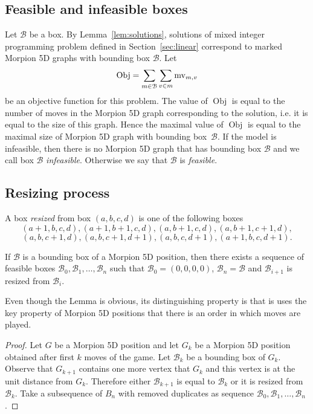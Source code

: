 \subsection{Feasible and infeasible boxes}

Let $\mathcal{B}$ be a box.
By Lemma~\ref{lem:solutions}, solutions of mixed integer programming problem
  defined in Section~\ref{sec:linear} correspond to marked Morpion 5D graphs with bounding
  box $\mathcal{B}$.
Let
  \[
    \operatorname{Obj} = \sum_{m \in \mathcal{B}} \sum_{v \in m} \operatorname{mv}_{m, v}
  \]
be an objective function for this problem. The value of $\operatorname{Obj}$ is equal to the number
 of moves in the   Morpion 5D graph corresponding to the solution, i.e. it is equal to the size of this graph.
Hence the maximal value of $\operatorname{Obj}$ is equal to the maximal size of Morpion 5D graph with bounding box~$\mathcal{B}$.
If the model is infeasible, then there is no Morpion 5D graph that has bounding box $\mathcal{B}$ and we call box $\mathcal{B}$ \emph{infeasible}. Otherwise we say that $\mathcal{B}$ is \emph{feasible}.

\subsection{Resizing process}

\begin{definition} A box \emph{resized} from box $(a, b, c, d)$ is one of the following boxes
\[
  (a + 1, b, c, d), (a + 1, b +1 , c, d),  (a, b + 1, c, d), 
(a, b + 1, c + 1, d), 
\]
\[
(a, b, c + 1, d), (a, b, c + 1, d + 1),
(a, b, c, d + 1), (a + 1, b, c, d + 1).     
\]
\end{definition}

\begin{lemma}\label{lem:resizing}
If $\mathcal{B}$ is a bounding box of a Morpion 5D position, then there exists a sequence of
  feasible
  boxes $\mathcal{B}_0, \mathcal{B}_1, \ldots, \mathcal{B}_n$ such that
  $\mathcal{B}_0 = (0,0,0,0)$, $\mathcal{B}_n = \mathcal{B}$ and 
  $\mathcal{B}_{i+1}$ is resized from $\mathcal{B}_{i}$.
\end{lemma}

Even though the Lemma is obvious, its distinguishing property is that
  is uses the key property of Morpion 5D positions that there is an order in which moves are played.
  
\begin{proof}
Let $G$ be a Morpion 5D position and let $G_k$ be a Morpion 5D position
  obtained after first $k$ moves of the game.
Let $\mathcal{B}_k$ be a bounding box of $G_k$.
Observe that $G_{k+1}$ contains one more vertex that $G_{k}$ and this vertex is at the unit distance
  from $G_{k}$.
Therefore either $\mathcal{B}_{k+1}$ is equal to $\mathcal{B}_k$ or it is resized from $\mathcal{B}_k$.
Take a subsequence of $B_n$ with removed duplicates as sequence $\mathcal{B}_0, \mathcal{B}_1, \ldots, \mathcal{B}_n$.
\end{proof}


